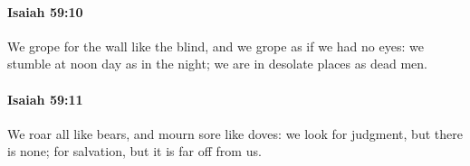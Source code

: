 		\paragraph{Isaiah 59:10} %
			\label{ISAIAH-59-10}

			We grope for the wall like the blind, and we grope as if we had no eyes: we stumble at noon day as in the night; we are in desolate places as dead men.


		\paragraph{Isaiah 59:11} %
			\label{ISAIAH-59-11}

			We roar all like bears, and mourn sore like doves: we look for judgment, but there is none; for salvation, but it is far off from us.


